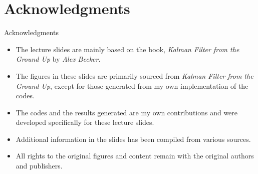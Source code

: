 \section*{Acknowledgments}
\begin{frame}{Acknowledgments}
    \begin{itemize}
        \item The lecture slides are mainly based on the book, \textit{Kalman Filter from the Ground Up} by \textit{Alex Becker}.
        
        \item The figures in these slides are primarily sourced from \textit{Kalman Filter
        from the Ground Up}, except for those generated from my own implementation of the codes.
        \item The codes and the results generated are my own contributions and were developed specifically for these lecture slides.
        \item Additional information in the slides has been compiled from various sources.
        \item All rights to the original figures and content remain with the original authors and publishers.
    \end{itemize}
\end{frame}